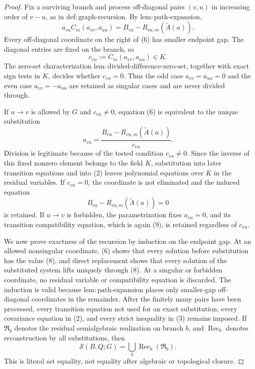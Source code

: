 \documentclass{article}
\begin{document}
\begin{proof}
Fix a surviving branch and process off-diagonal pairs \((v,u)\) in increasing order of \(v-u\), as in \(\mathrm{def{:}graph\mbox{-}recursion}\).  By \(\mathrm{lem{:}path\mbox{-}expansion}\),
\[
 a_{vu}C_m(a_{vv},a_{uu})
 =B_{vu}-R_{vu,m}(\widetilde A(a)).                               \tag{6}
\]
Every off-diagonal coordinate on the right of (6) has smaller endpoint gap.  The diagonal entries are fixed on the branch, so
\[
 c_{vu}:=C_m(a_{vv},a_{uu})\in K.                                \tag{7}
\]
The zero-set characterization \(\mathrm{lem{:}divided\mbox{-}difference\mbox{-}zero\mbox{-}set}\), together with exact sign tests in \(K\), decides whether \(c_{vu}=0\).  Thus the odd case \(a_{vv}=a_{uu}=0\) and the even case \(a_{vv}=-a_{uu}\) are retained as singular cases and are never divided through.

If \(u\to v\) is allowed by \(G\) and \(c_{vu}\ne0\), equation (6) is equivalent to the unique substitution
\[
 a_{vu}
 =\frac{B_{vu}-R_{vu,m}(\widetilde A(a))}{c_{vu}}.                \tag{8}
\]
Division is legitimate because of the tested condition \(c_{vu}\ne0\).  Since the inverse of this fixed nonzero element belongs to the field \(K\), substitution into later transition equations and into (2) leaves polynomial equations over \(K\) in the residual variables.  If \(c_{vu}=0\), the coordinate is not eliminated and the induced equation
\[
 B_{vu}-R_{vu,m}(\widetilde A(a))=0                               \tag{9}
\]
is retained.  If \(u\to v\) is forbidden, the parametrization fixes \(a_{vu}=0\), and its transition compatibility equation, which is again (9), is retained regardless of \(c_{vu}\).

We now prove exactness of the recursion by induction on the endpoint gap.  At an allowed nonsingular coordinate, (6) shows that every solution before substitution has the value (8), and direct replacement shows that every solution of the substituted system lifts uniquely through (8).  At a singular or forbidden coordinate, no residual variable or compatibility equation is discarded.  The induction is valid because \(\mathrm{lem{:}path\mbox{-}expansion}\) places only smaller-gap off-diagonal coordinates in the remainder.  After the finitely many pairs have been processed, every transition equation not used for an exact substitution, every covariance equation in (2), and every strict inequality in (3) remains imposed.  If \(\mathfrak R_b\) denotes the residual semialgebraic realization on branch \(b\), and \(\operatorname{Rec}_b\) denotes reconstruction by all substitutions, then
\[
 \mathcal S(B,Q;G)
 =\bigcup_b\operatorname{Rec}_b(\mathfrak R_b).                  \tag{10}
\]
This is literal set equality, not equality after algebraic or topological closure.


\end{proof}
\end{document}
